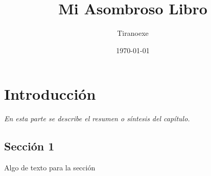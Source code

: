 \documentclass[]{book}
\title{\bf Mi Asombroso Libro}
\author{Tiranoexe}
\date{\today}
\begin{document}
\frontmatter
\maketitle
\tableofcontents
\mainmatter
\chapter{Introducción}
\begin{center}
\textit{En esta parte se describe el resumen o síntesis
del capítulo.}
\end{center}
\section{Sección 1}
Algo de texto para la sección
\end{document}
